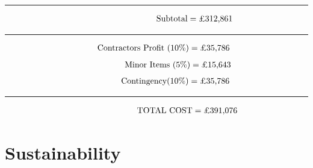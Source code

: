 \documentclass[12pt, a4paper]{article}
\begin{document}
\hrule
\begin{align*}
\hspace*{3.2cm}
    \text{Subtotal}=\text{£312,861}
\end{align*}
\hrule
\begin{align*}
\hspace*{0.6cm}
    \text{Contractors Profit (10\%)}=\text{£35,786}
\end{align*}
\begin{align*}
\hspace*{1.8cm}
    \text{Minor Items (5\%)}=\text{£15,643}
\end{align*}
\begin{align*}
\hspace*{1.6cm}
    \text{Contingency(10\%)}=\text{£35,786}
\end{align*}
\hrule
\begin{align*}
\hspace*{2.6cm}
    \text{TOTAL COST}=\text{£391,076}
\end{align*}
\section{Sustainability}
\end{document}
